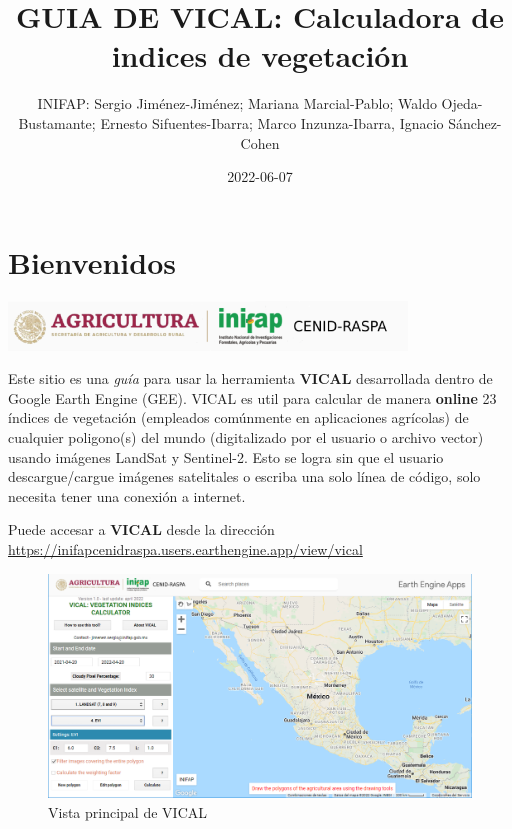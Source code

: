 \documentclass[
]{book}
\title{GUIA DE VICAL: Calculadora de indices de vegetación}
\author{INIFAP: Sergio Jiménez-Jiménez; Mariana Marcial-Pablo; Waldo Ojeda-Bustamante; Ernesto Sifuentes-Ibarra; Marco Inzunza-Ibarra, Ignacio Sánchez-Cohen}
\date{2022-06-07}
\begin{document}
\maketitle

{
\setcounter{tocdepth}{1}
\tableofcontents
}
\hypertarget{bienvenidos}{%
\chapter*{Bienvenidos}\label{bienvenidos}}

\begin{center}\includegraphics{./images/LogoVICAL} \end{center}

Este sitio es una \emph{guía} para usar la herramienta \textbf{VICAL} desarrollada dentro de Google Earth Engine (GEE). VICAL es util para calcular de manera \textbf{online} 23 índices de vegetación (empleados comúnmente en aplicaciones agrícolas) de cualquier poligono(s) del mundo (digitalizado por el usuario o archivo vector) usando imágenes LandSat y Sentinel-2. Esto se logra sin que el usuario descargue/cargue imágenes satelitales o escriba una solo línea de código, solo necesita tener una conexión a internet.

Puede accesar a \textbf{VICAL} desde la dirección
\url{https://inifapcenidraspa.users.earthengine.app/view/vical}

\begin{figure}

{\centering \includegraphics[width=0.9\linewidth]{./images/Figure4} 

}

\caption{Vista principal de VICAL}\label{fig:fig2}
\end{figure}
\end{document}
